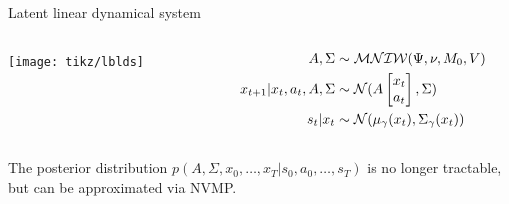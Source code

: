 \documentclass[10pt, compress]{beamer}
\begin{document}

\begin{frame}{Latent linear dynamical system}
  \begin{columns}
    \begin{column}{0.3\textwidth}
        \texttt{[image: tikz/lblds]}
    \end{column}
    \hspace{10pt}
    \begin{column}{0.6\textwidth}
      \begin{align*}
        A, \Sigma &\sim \mathcal{MNIW}(\Psi, \nu, M_0, V) \\
        x_{t + 1} | x_t, a_t, A, \Sigma &\sim \mathcal{N}(A\begin{bmatrix}x_t\\a_t\end{bmatrix}, \Sigma) \\
        s_t | x_t &\sim \mathcal{N}(\mu_\gamma(x_t), \Sigma_\gamma(x_t))
      \end{align*}
    \end{column}
  \end{columns}
	The posterior distribution 
	$
	p(A, \Sigma, x_0, \ldots, x_T | {s_0, a_0, \ldots, s_T})
	$
	is no longer tractable, but can be approximated via NVMP.
\end{frame}
\end{document}
